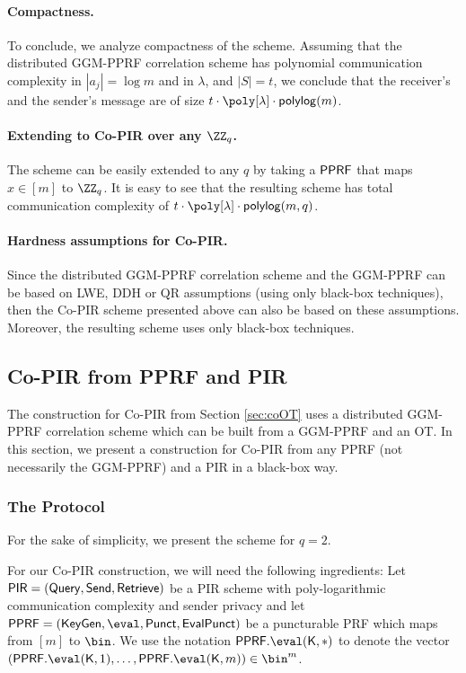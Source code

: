 \paragraph{Compactness.} To conclude, we analyze compactness of the scheme. Assuming that the distributed GGM-PPRF correlation scheme has polynomial communication complexity in $|a_j|=\log m$ and in $\lambda$,  and $|S|=t$, we conclude that the receiver's and the sender's message are of size $t\cdot\poly[\lambda]\cdot\mathsf{polylog}(m)$.

\paragraph{Extending to Co-PIR over any $\ZZ_q$.} The scheme can be easily extended to any $q$ by taking a $\mathsf{PPRF}$ that maps $x\in[m] $ to $\ZZ_q$. It is easy to see that the resulting scheme has total communication complexity of $t\cdot\poly[\lambda]\cdot\mathsf{polylog}(m,q)$.

\paragraph{Hardness assumptions for Co-PIR.} Since the distributed GGM-PPRF correlation scheme and the GGM-PPRF can be based on LWE, DDH or QR assumptions (using only black-box techniques), then the Co-PIR scheme presented above can also be based on these assumptions. Moreover, the resulting scheme uses only black-box techniques.



\subsection{Co-PIR from PPRF and PIR}
\label{app:CoPIRfromPPRandPIR}
The construction for Co-PIR from Section \ref{sec:coOT} uses a distributed GGM-PPRF correlation scheme which can be built from a GGM-PPRF and an OT. 
In this section, we present a construction for Co-PIR from any PPRF (not necessarily the GGM-PPRF) and a PIR in a black-box way.


\subsubsection{The Protocol}
For the sake of simplicity, we present the scheme for $q=2$. 

For our Co-PIR construction, we will need the following ingredients: Let $\mathsf{PIR}=(\mathsf{Query},\mathsf{Send},\mathsf{Retrieve})$ be a PIR scheme with poly-logarithmic communication complexity and sender privacy and let $\PPRF = (\keygen,\eval,\puncture,\evalpunct)$ be a puncturable PRF which maps from $[m]$ to $\bin$. We use the notation $\PPRF.\eval(\key,\ast)$ to denote the vector $(\PPRF.\eval(\key,1),\dots,\PPRF.\eval(\key,m)) \in \bin^m$.

